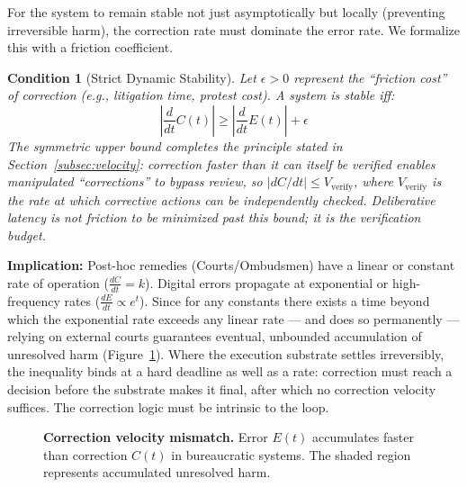 \documentclass{article}
\newtheorem{condition}{Condition}[section]
\begin{document}
For the system to remain stable not just asymptotically but locally (preventing irreversible harm), the correction rate must dominate the error rate. We formalize this with a friction coefficient.

\begin{condition}[Strict Dynamic Stability]
\label{cond:friction}
Let $\epsilon > 0$ represent the ``friction cost'' of correction (e.g., litigation time, protest cost). A system is stable iff:
\begin{equation}
\left| \frac{d}{dt} C(t) \right| \ge \left| \frac{d}{dt} E(t) \right| + \epsilon
\end{equation}
The symmetric upper bound completes the principle stated in Section~\ref{subsec:velocity}: correction faster than it can itself be verified enables manipulated ``corrections'' to bypass review, so $|dC/dt| \le V_{\text{verify}}$, where $V_{\text{verify}}$ is the rate at which corrective actions can be independently checked. Deliberative latency is not friction to be minimized past this bound; it is the verification budget.
\end{condition}

\textbf{Implication:} Post-hoc remedies (Courts/Ombudsmen) have a linear or constant rate of operation ($\frac{dC}{dt} = k$). Digital errors propagate at exponential or high-frequency rates ($\frac{dE}{dt} \propto e^{t}$). Since for any constants there exists a time beyond which the exponential rate exceeds any linear rate --- and does so permanently --- relying on external courts guarantees eventual, unbounded accumulation of unresolved harm (Figure~\ref{fig:velocity-mismatch}). Where the execution substrate settles irreversibly, the inequality binds at a hard deadline as well as a rate: correction must reach a decision before the substrate makes it final, after which no correction velocity suffices. The correction logic must be intrinsic to the loop.

\begin{figure}[htbp]
\centering
{}
\caption{\textbf{Correction velocity mismatch.} Error $E(t)$ accumulates faster than correction $C(t)$ in bureaucratic systems. The shaded region represents accumulated unresolved harm.}
\label{fig:velocity-mismatch}
\end{figure}
\end{document}
